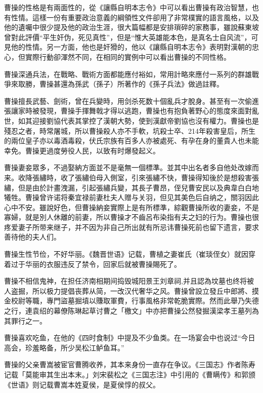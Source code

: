 曹操的性格是有兩面性的，從《讓縣自明本志令》中可以看出曹操有政治智慧，也有性情。這樣一份有重要政治意義的綱領性文件卻用了非常樸實的語言風格，以及他的遺囑中很少提及他的政治生涯，很大篇幅都是安排瑣碎的家務事，雖說蘇東坡曾對此評價“平生奸伪，死见真性”，但是“惟大英雄能本色，是真名士自风流”，可見他的性情。另一方面，他也是奸猾的，他以《讓縣自明本志令》表明對漢朝的忠心，但實際行動卻渾然不同，在相同的實例中可以看出曹操的不同性格。

曹操深通兵法，在戰略、戰術方面都能應付裕如，常用計略來應付一系列的群雄戰爭來取勝，曹操甚還為孫武（孫子）所著作的《孫子兵法》做過註釋。

曹操擅長武藝、劍術，曾在兵變時，用剑杀死数十個亂兵才脫身。甚至有一次偷進張讓家時被發現，曹操手揮舞戟才得以逃跑，曹操也有抱負著野心的態度來面對亂世，如其迎接劉協代表其掌控了漢朝大勢，使到漢獻帝劉協也沒有權力。曹操也是殘忍之者，時常屠城，所以曹操殺人亦不手軟，坑殺士卒、214年殺害皇后，所生的兩位皇子亦以毒酒毒殺，伏氏宗族有百多人亦被處死、有孕在身的董貴人也未能幸免。曹操更過度勞役人民，以致有时爆發起义。

曹操妻妾眾多，不過娶納方面並不是毫無一個標準。並其中出名者多自他处改嫁而来。收降張繡時，收了張繡伯母入側室，引來張繡不快，曹操得知後於是想殺害張繡，但是由於計畫洩漏，引起張繡兵變，其長子曹昂，侄兒曹安民以及典韋白白地犧牲。曹操曾许诺将秦宜禄前妻杜夫人赠与关羽，但见其美色后自纳之，關羽因此心中不安。雖說好色，但曹操納妾實際上是有所標準，綜觀曹操所收的妻妾，不是寡婦，就是別人休離的前妻，所以曹操才不齒呂布染指有夫之妇的行为。曹操也很疼爱妻子所带来继子，并不因为非自己所出就有所忌讳曹操死前也留下遗言，要求善待他的夫人们。

曹操生性节俭，不好华丽。《魏晋世语》记载，曹植之妻崔氏（崔琰侄女）就因穿着过于华丽的衣服违反了禁令，回家后就被曹操賜死了。

曹操不相信鬼神，在担任济南相期间捣毁城阳景王刘章祠,并且認為坟墓也终将被人盗掘，所以极力提倡丧葬从简，一改汉代奢华之风。曹操曾設立發丘中郎將、摸金校尉等職，專門盜墓掘墳以賺取軍費，行事風格非常乾脆實際。然而此舉乃失德之行，連袁绍的幕僚陈琳起草讨曹之「檄文」中亦把曹操公然發掘漢梁孝王墓列為其罪行之一。

曹操喜欢吃鱼，在他的《四时食制》中提及不少鱼类。在一场宴会中也说过“今日高会，珍羞略备，所少吴松江鲈鱼耳。”

曹操的父亲曹嵩被宦官曹腾收养，其本来身份一直存在争议。《三国志》作者陈寿记载「莫能审其生出本末。」刘宋裴松之《三国志注》中引用的《曹瞒传》和郭颁《世语》则记载曹嵩本姓夏侯，是夏侯惇的叔父。


